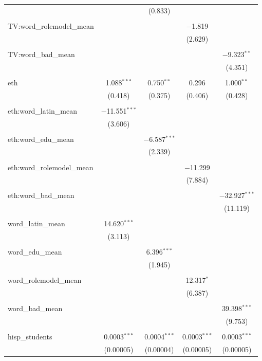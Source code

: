 \begin{table}[!htbp]
\begin{tabular}{@{\extracolsep{-2pt}}lcccc}
  &  & (0.833) &  &  \\ 
  & & & & \\ 
 TV:word\_rolemodel\_mean &  &  & $-$1.819 &  \\ 
  &  &  & (2.629) &  \\ 
  & & & & \\ 
 TV:word\_bad\_mean &  &  &  & $-$9.323$^{**}$ \\ 
  &  &  &  & (4.351) \\ 
  & & & & \\ 
 eth & 1.088$^{***}$ & 0.750$^{**}$ & 0.296 & 1.000$^{**}$ \\ 
  & (0.418) & (0.375) & (0.406) & (0.428) \\ 
  & & & & \\ 
 eth:word\_latin\_mean & $-$11.551$^{***}$ &  &  &  \\ 
  & (3.606) &  &  &  \\ 
  & & & & \\ 
 eth:word\_edu\_mean &  & $-$6.587$^{***}$ &  &  \\ 
  &  & (2.339) &  &  \\ 
  & & & & \\ 
 eth:word\_rolemodel\_mean &  &  & $-$11.299 &  \\ 
  &  &  & (7.884) &  \\ 
  & & & & \\ 
 eth:word\_bad\_mean &  &  &  & $-$32.927$^{***}$ \\ 
  &  &  &  & (11.119) \\ 
  & & & & \\ 
 word\_latin\_mean & 14.620$^{***}$ &  &  &  \\ 
  & (3.113) &  &  &  \\ 
  & & & & \\ 
 word\_edu\_mean &  & 6.396$^{***}$ &  &  \\ 
  &  & (1.945) &  &  \\ 
  & & & & \\ 
 word\_rolemodel\_mean &  &  & 12.317$^{*}$ &  \\ 
  &  &  & (6.387) &  \\ 
  & & & & \\ 
 word\_bad\_mean &  &  &  & 39.398$^{***}$ \\ 
  &  &  &  & (9.753) \\ 
  & & & & \\ 
 hisp\_students & 0.0003$^{***}$ & 0.0004$^{***}$ & 0.0003$^{***}$ & 0.0003$^{***}$ \\ 
  & (0.00005) & (0.00004) & (0.00005) & (0.00005) \\ 

\end{tabular}
\end{table}
